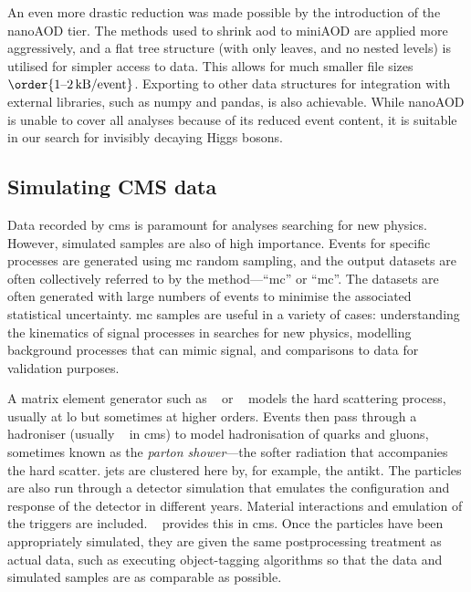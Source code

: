 An even more drastic reduction was made possible by the introduction of the nanoAOD tier. The methods used to shrink \acrshort{aod} to miniAOD are applied more aggressively, and a flat tree structure (with only leaves, and no nested levels) is utilised for simpler access to data. This allows for much smaller file sizes $\order{\text{1--2\,kB}/\text{event}}$. Exporting to other data structures for integration with external libraries, such as \textsf{numpy} and \textsf{pandas}, is also achievable. While nanoAOD is unable to cover all analyses because of its reduced event content, it is suitable in our search for invisibly decaying Higgs bosons.




\subsection{Simulating CMS data}
\label{subsec:cms_mc}

Data recorded by \acrshort{cms} is paramount for analyses searching for new physics. However, simulated samples are also of high importance. Events for specific processes are generated using \acrfull{mc} random sampling, and the output datasets are often collectively referred to by the method---``\acrlong{mc}'' or ``\acrshort{mc}''. The datasets are often generated with large numbers of events to minimise the associated statistical uncertainty. \acrshort{mc} samples are useful in a variety of cases: understanding the kinematics of signal processes in searches for new physics, modelling background processes that can mimic signal, and comparisons to data for validation purposes.

A matrix element generator such as \madgraph~\cite{Alwall:2014hca} or \POWHEG~\cite{Nason:2004rx,Frixione:2007vw} models the hard scattering process, usually at \acrfull{lo} but sometimes at higher orders. Events then pass through a hadroniser (usually \PYTHIA~\cite{pythia82} in \acrshort{cms}) to model hadronisation of quarks and gluons, sometimes known as the \emph{parton shower}---the softer radiation that accompanies the hard scatter. \Glspl{jet} are clustered here by, for example, the \gls{antikt}. The particles are also run through a detector simulation that emulates the configuration and response of the detector in different years. Material interactions and emulation of the triggers are included. \GEANTfour~\cite{AGOSTINELLI2003250,1610988,ALLISON2016186} provides this in \acrshort{cms}. Once the particles have been appropriately simulated, they are given the same postprocessing treatment as actual data, such as executing object-tagging algorithms so that the data and simulated samples are as comparable as possible.


